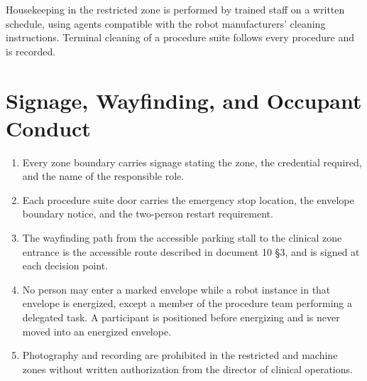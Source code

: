 Housekeeping in the restricted zone is performed by trained staff on a written
schedule, using agents compatible with the robot manufacturers' cleaning
instructions. Terminal cleaning of a procedure suite follows every procedure and
is recorded.

\section{Signage, Wayfinding, and Occupant Conduct}

\begin{enumerate}
\item Every zone boundary carries signage stating the zone, the credential
  required, and the name of the responsible role.

\item Each procedure suite door carries the emergency stop location, the
  envelope boundary notice, and the two-person restart requirement.

\item The wayfinding path from the accessible parking stall to the clinical zone
  entrance is the accessible route described in document 10 §3, and is signed at
  each decision point.

\item No person may enter a marked envelope while a robot instance in that
  envelope is energized, except a member of the procedure team performing a
  delegated task. A participant is positioned before energizing and is never
  moved into an energized envelope.

\item Photography and recording are prohibited in the restricted and machine
  zones without written authorization from the director of clinical operations.
\end{enumerate}
